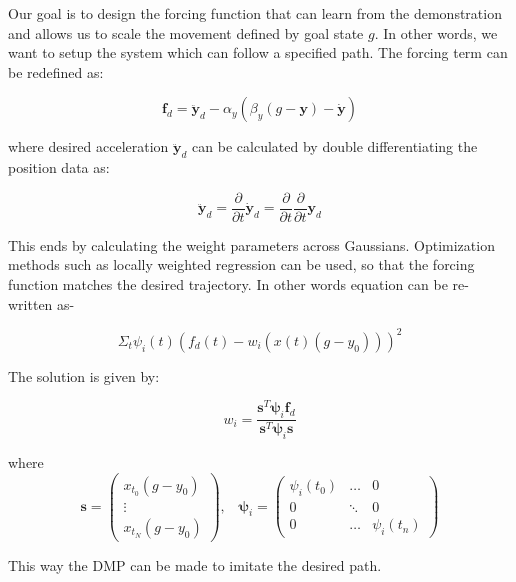 \documentclass[sigconf]{acmart}
\begin{document}
Our goal is to design the forcing function that can learn from the demonstration and allows us to scale the movement defined by goal state $g$. In other words, we want to setup the system which can follow a specified path. The forcing term can be redefined as:

\begin{equation}
	\textbf{f}_d = \ddot{\textbf{y}}_d - \alpha_y ( \beta_y (g - \textbf{y}) - \dot{\textbf{y}})
\end{equation}

where desired acceleration $\ddot{\textbf{y}}_d$ can be calculated by double differentiating the position data as:

\begin{equation*}
	\ddot{\textbf{y}}_d = \frac{\partial}{\partial t} \dot{\textbf{y}}_d = \frac{\partial}{\partial t} \frac{\partial}{\partial t} \textbf{y}_d
\end{equation*}

This ends by calculating the weight parameters across Gaussians. Optimization methods such as locally weighted regression can be used, so that the forcing function matches the desired trajectory. In other words equation can be re-written as-

\begin{equation}
	\Sigma_t \psi_i(t)(f_d(t) - w_i (x(t) (g - y_0)))^2
\end{equation}

The solution\cite{vijayakumar2000locally} is given by:

\begin{equation}
	w_i = \frac{\textbf{s}^T \pmb{\psi}_i \textbf{f}_d}{\textbf{s}^T \pmb{\psi}_i \textbf{s}}
\end{equation}

where
\begin{equation*}
	\textbf{s} = \left( \begin{array}{c}x_{t_0}(g - y_0) \\ \vdots \\ x_{t_N}(g - y_0) \end{array} \right), \;\;\; \pmb{\psi}_i = \left( \begin{array}{ccc} \psi_i(t_0) & \dots & 0 \\ 0 & \ddots & 0 \\ 0 & \dots & \psi_i(t_n) \end{array} \right)
\end{equation*}

This way the DMP can be made to imitate the desired path.
\end{document}
